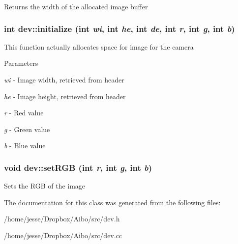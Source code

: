 \label{classdev_adc3b057042e6069d8e2432c48418c173}
Returns the width of the allocated image buffer \hypertarget{classdev_aea51d02a9f5c04fdacc63b415d7fba6f}{
\subsubsection[{initialize}]{\setlength{\rightskip}{0pt plus 5cm}int dev::initialize (int {\em wi}, \/  int {\em he}, \/  int {\em de}, \/  int {\em r}, \/  int {\em g}, \/  int {\em b})}}
\label{classdev_aea51d02a9f5c04fdacc63b415d7fba6f}
This function actually allocates space for image for the camera 
\begin{DoxyParams}{Parameters}
\item[{\em wi}]-\/ Image width, retrieved from header \item[{\em he}]-\/ Image height, retrieved from header \item[{\em r}]-\/ Red value \item[{\em g}]-\/ Green value \item[{\em b}]-\/ Blue value \end{DoxyParams}
\hypertarget{classdev_aae6a7a4192d0bf1090456d8fa5d27a09}{
\subsubsection[{setRGB}]{\setlength{\rightskip}{0pt plus 5cm}void dev::setRGB (int {\em r}, \/  int {\em g}, \/  int {\em b})}}
\label{classdev_aae6a7a4192d0bf1090456d8fa5d27a09}
Sets the RGB of the image 

The documentation for this class was generated from the following files:\begin{DoxyCompactItemize}
\item 
/home/jesse/Dropbox/Aibo/src/dev.h\item 
/home/jesse/Dropbox/Aibo/src/dev.cc\end{DoxyCompactItemize}
